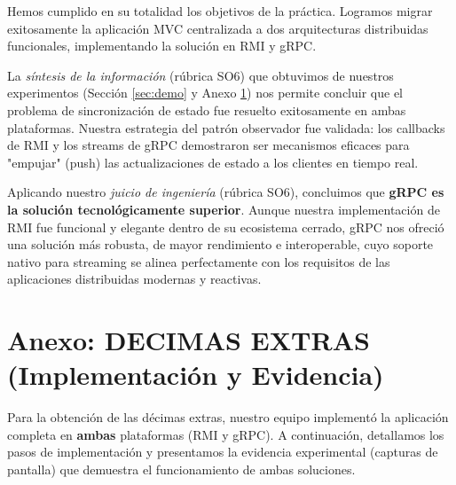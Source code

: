 \documentclass[11pt, a4paper]{article}
\begin{document}
Hemos cumplido en su totalidad los objetivos de la práctica.
Logramos migrar exitosamente la aplicación MVC centralizada a dos arquitecturas distribuidas funcionales, implementando la solución en RMI y gRPC.

La \textit{síntesis de la información} (rúbrica SO6) que obtuvimos de nuestros experimentos (Sección \ref{sec:demo} y Anexo \ref{sec:anexo}) nos permite concluir que el problema de sincronización de estado fue resuelto exitosamente en ambas plataformas.
Nuestra estrategia del patrón observador fue validada: los callbacks de RMI y los streams de gRPC demostraron ser mecanismos eficaces para "empujar" (push) las actualizaciones de estado a los clientes en tiempo real.

Aplicando nuestro \textit{juicio de ingeniería} (rúbrica SO6), concluimos que \textbf{gRPC es la solución tecnológicamente superior}.
Aunque nuestra implementación de RMI fue funcional y elegante dentro de su ecosistema cerrado, gRPC nos ofreció una solución más robusta, de mayor rendimiento e interoperable, cuyo soporte nativo para streaming se alinea perfectamente con los requisitos de las aplicaciones distribuidas modernas y reactivas.

\newpage
\appendix

\section{Anexo: DECIMAS EXTRAS (Implementación y Evidencia)}
\label{sec:anexo}

Para la obtención de las décimas extras, nuestro equipo implementó la aplicación completa en \textbf{ambas} plataformas (RMI y gRPC).
A continuación, detallamos los pasos de implementación y presentamos la evidencia experimental (capturas de pantalla) que demuestra el funcionamiento de ambas soluciones.
\end{document}
